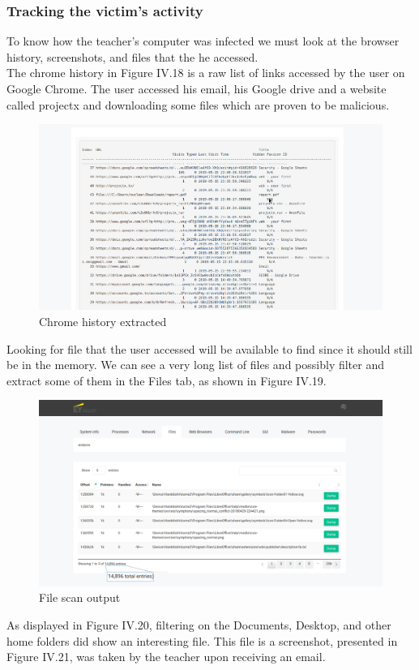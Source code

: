 \subsubsection{Tracking the victim's activity}
To know how the teacher's computer was infected we must look at the browser history, screenshots, and files that the he accessed.\\
The chrome history in Figure IV.18 is a raw list of links accessed by the user on Google Chrome. The user accessed his email, his Google drive and a website called projectx and downloading some files which are proven to be malicious.
\begin{figure}[H]
\centering
\includegraphics[width=0.9\columnwidth]{Figures/18.png}
\caption{Chrome history extracted}
\end{figure}
Looking for file that the user accessed will be available to find since it should still be in the memory. We can see a very long list of files and possibly filter and extract some of them in the Files tab, as shown in Figure IV.19.
\begin{figure}[H]
\centering
\includegraphics[width=0.9\columnwidth]{Figures/19.png}
\caption{File scan output}
\end{figure}
As displayed in Figure IV.20, filtering on the Documents, Desktop, and other home folders did show an interesting file. This file is a screenshot, presented in Figure IV.21, was taken by the teacher upon receiving an email.
